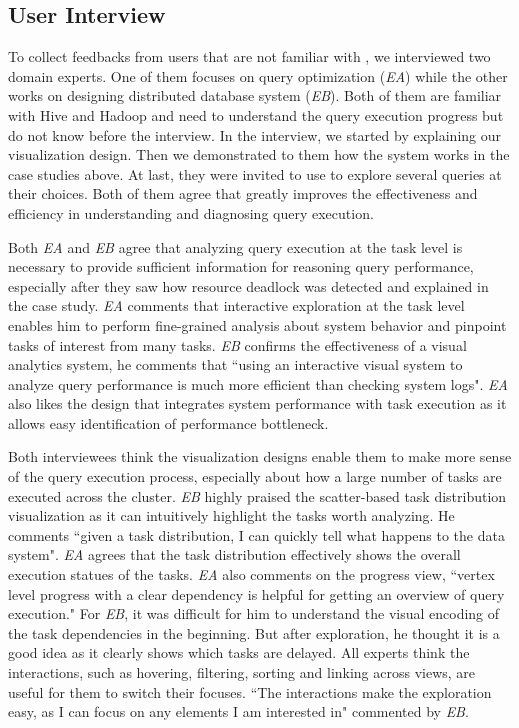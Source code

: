 \subsection{User Interview} \label{sec:user}

To collect feedbacks from users that are not familiar with \qevis{}, we interviewed two domain experts. One of them focuses on query optimization (\textit{EA}) while the other works on designing distributed database system (\textit{EB}). Both of them are familiar with Hive and Hadoop and need to understand the query execution progress but do not know \qevis{} before the interview. In the interview, we started by explaining our visualization design. Then we demonstrated to them how the system works in the case studies above. At last, they were invited to use \qevis{} to explore several queries at their choices. Both of them agree that \qevis{} greatly improves the effectiveness and efficiency in understanding and diagnosing query execution.       


Both \textit{EA} and \textit{EB} agree that analyzing query execution at the task level is necessary to provide sufficient information for reasoning query performance, especially after they saw how resource deadlock was detected and explained in the case study. \textit{EA} comments that interactive exploration at the task level enables him to perform fine-grained analysis about system behavior and pinpoint tasks of interest from many tasks. \textit{EB} confirms the effectiveness of a visual analytics system, he comments that ``using an interactive visual system to analyze query performance is much more efficient than checking system logs". \textit{EA} also likes the design that integrates system performance with task execution as it allows easy identification of performance bottleneck. 

Both interviewees think the visualization designs enable them to make more sense of the query execution process, especially about how a large number of tasks are executed across the cluster. \textit{EB} highly praised the scatter-based task distribution visualization as it can intuitively highlight the tasks worth analyzing. He comments ``given a task distribution, I can quickly tell what happens to the data system". \textit{EA} agrees that the task distribution effectively shows the overall execution statues of the tasks. \textit{EA} also comments on the progress view, ``vertex level progress with a clear dependency is helpful for getting an overview of query execution." For \textit{EB}, it was difficult for him to understand the visual encoding of the task dependencies in the beginning. But after exploration, he thought it is a good idea as it clearly shows which tasks are delayed.
All experts think the interactions, such as hovering, filtering, sorting and linking across views, are useful for them to switch their focuses. ``The interactions make the exploration easy, as I can focus on any elements I am interested in" commented by \textit{EB}.

